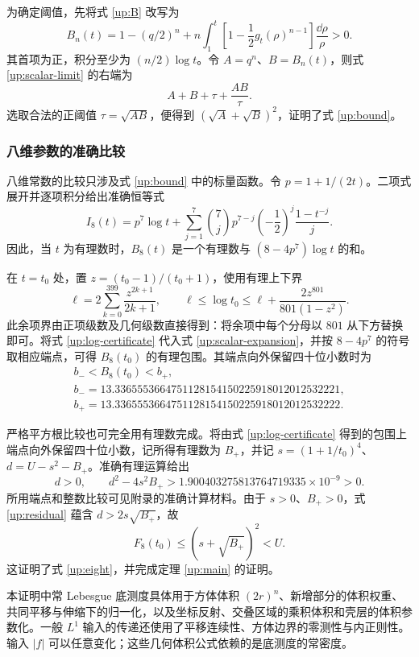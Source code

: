 为确定阈值，先将式 \eqref{up:B} 改写为
\[
 B_n(t)=1-(q/2)^n+
 n\int_1^t\left[1-\frac12g_t(\rho)^{n-1}\right]\frac{\dd\rho}{\rho}>0.
\]
其首项为正，积分至少为 $(n/2)\log t$。令 $A=q^n$、$B=B_n(t)$，则式 \eqref{up:scalar-limit} 的右端为
\[
 A+B+\tau+\frac{AB}\tau.
\]
选取合法的正阈值 $\tau=\sqrt{AB}$，便得到 $(\sqrt A+\sqrt B)^2$，证明了式 \eqref{up:bound}。

\subsubsection{八维参数的准确比较}

八维常数的比较只涉及式 \eqref{up:bound} 中的标量函数。令
$p=1+1/(2t)$。二项式展开并逐项积分给出准确恒等式
\begin{equation}\label{up:scalar-expansion}
 I_8(t)=p^7\log t+
 \sum_{j=1}^7\binom7j p^{7-j}\left(-\frac12\right)^j
              \frac{1-t^{-j}}j.
\end{equation}
因此，当 $t$ 为有理数时，$B_8(t)$ 是一个有理数与
$(8-4p^7)\log t$ 的和。

在 $t=t_0$ 处，置 $z=(t_0-1)/(t_0+1)$，使用有理上下界
\begin{equation}\label{up:log-certificate}
 \ell=2\sum_{k=0}^{399}\frac{z^{2k+1}}{2k+1},\qquad
 \ell\le\log t_0\le
 \ell+\frac{2z^{801}}{801(1-z^2)}.
\end{equation}
此余项界由正项级数及几何级数直接得到：将余项中每个分母以 $801$ 从下方替换即可。将式 \eqref{up:log-certificate} 代入式 \eqref{up:scalar-expansion}，并按 $8-4p^7$ 的符号取相应端点，可得 $B_8(t_0)$ 的有理包围。其端点向外保留四十位小数时为
\begin{equation}\label{up:B-enclosure}
\begin{gathered}
 b_-<B_8(t_0)<b_+,\\
 b_-=13.3365553664751128154150225918012012532221,\\
 b_+=13.3365553664751128154150225918012012532222.
\end{gathered}
\end{equation}

严格平方根比较也可完全用有理数完成。将由式 \eqref{up:log-certificate} 得到的包围上端点向外保留四十位小数，记所得有理数为 $B_+$，并记
$s=(1+1/t_0)^4$、$d=U-s^2-B_+$。准确有理运算给出
\begin{equation}\label{up:residual}
 d>0,\qquad
 d^2-4s^2B_+>
 1.900403275813764719335\times10^{-9}>0.
\end{equation}
所用端点和整数比较可见附录的准确计算材料。由于 $s>0$、$B_+>0$，式 \eqref{up:residual} 蕴含
$d>2s\sqrt{B_+}$，故
\[
 F_8(t_0)\le(s+\sqrt{B_+})^2<U.
\]
这证明了式 \eqref{up:eight}，并完成定理 \ref{up:main} 的证明。

\begin{remark}\label{up:Lebesgue}
本证明中常 Lebesgue 底测度具体用于方体体积 $(2r)^n$、新增部分的体积权重、共同平移与伸缩下的归一化，以及坐标反射、交叠区域的乘积体积和壳层的体积参数化。一般 $L^1$ 输入的传递还使用了平移连续性、方体边界的零测性与内正则性。输入 $|f|$ 可以任意变化；这些几何体积公式依赖的是底测度的常密度。
\end{remark}
